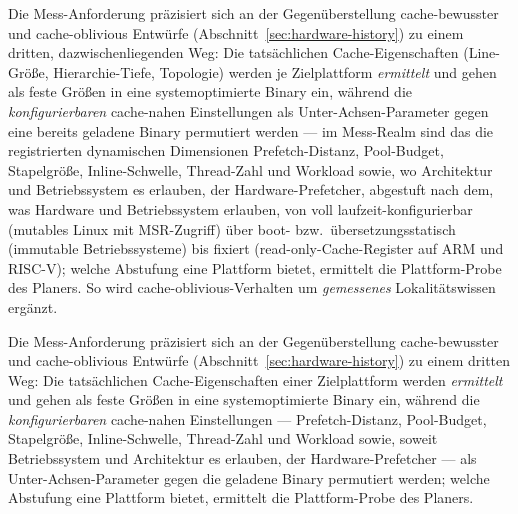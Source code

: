 \begin{nurlang}
Die Mess-Anforderung präzisiert sich an der Gegenüberstellung cache-bewusster und cache-oblivious
Entwürfe (Abschnitt~\ref{sec:hardware-history}) zu einem dritten, dazwischenliegenden Weg: Die
tatsächlichen Cache-Eigenschaften (Line-Größe, Hierarchie-Tiefe, Topologie) werden je Zielplattform
\emph{ermittelt} und gehen als feste Größen in eine systemoptimierte Binary ein, während die
\emph{konfigurierbaren} cache-nahen Einstellungen als Unter-Achsen-Parameter gegen eine bereits
geladene Binary permutiert werden --- im Mess-Realm sind das die registrierten dynamischen Dimensionen
Prefetch-Distanz, Pool-Budget, Stapelgröße, Inline-Schwelle, Thread-Zahl und Workload sowie, wo
Architektur und Betriebssystem es erlauben, der Hardware-Prefetcher, abgestuft nach dem, was Hardware
und Betriebssystem erlauben, von voll laufzeit-konfigurierbar (mutables Linux mit MSR-Zugriff) über
boot- bzw.\ übersetzungsstatisch (immutable Betriebssysteme) bis fixiert (read-only-Cache-Register auf
ARM und RISC-V); welche Abstufung eine Plattform bietet, ermittelt die Plattform-Probe des Planers. So
wird cache-oblivious-Verhalten um \emph{gemessenes} Lokalitätswissen ergänzt.
\end{nurlang}
\begin{nurkurz}
Die Mess-Anforderung präzisiert sich an der Gegenüberstellung cache-bewusster und cache-oblivious Entwürfe
(Abschnitt~\ref{sec:hardware-history}) zu einem dritten Weg: Die tatsächlichen Cache-Eigenschaften einer
Zielplattform werden \emph{ermittelt} und gehen als feste Größen in eine systemoptimierte Binary ein, während die
\emph{konfigurierbaren} cache-nahen Einstellungen --- Prefetch-Distanz, Pool-Budget, Stapelgröße,
Inline-Schwelle, Thread-Zahl und Workload sowie, soweit Betriebssystem und Architektur es erlauben, der
Hardware-Prefetcher --- als Unter-Achsen-Parameter gegen die geladene Binary permutiert werden; welche Abstufung
eine Plattform bietet, ermittelt die Plattform-Probe des Planers.
\end{nurkurz}

